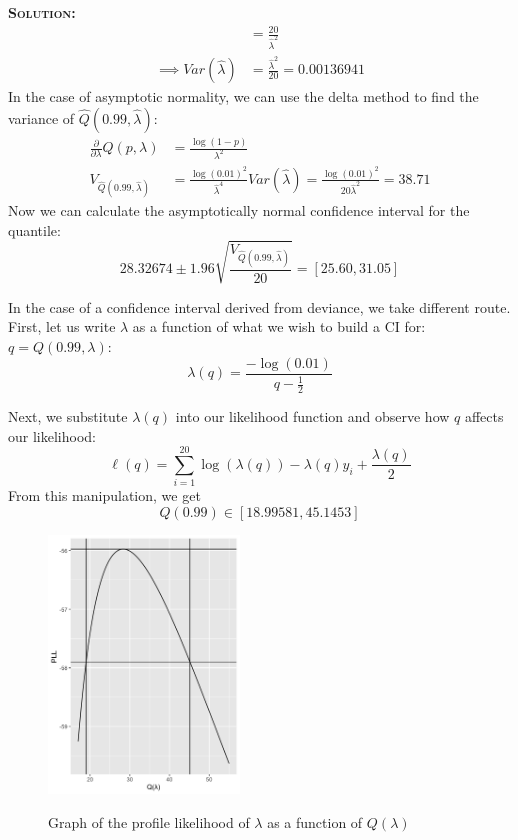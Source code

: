 \documentclass[12pt,oneside]{article}
\newenvironment{solution}
    {\textbf{\textsc{Solution:}}\\}
    {\newpage}
\def\l{\ell}
\def\pt{\partial}
\begin{document}
\begin{solution}
\begin{align*}
    &=\frac{20}{\hat{\lambda}^2}\\
    \implies Var(\hat{\lambda})&=\frac{\hat{\lambda}^2}{20}=0.00136941
\end{align*}
In the case of asymptotic normality, we can use the delta method to find the variance of $\hat{Q}(0.99,\hat{\lambda})$:
\begin{align*}
    \frac{\pt}{\pt \lambda}Q(p,\lambda)&= \frac{\log(1-p)}{\lambda^2}\\
    V_{\hat{Q}(0.99,\hat{\lambda})}&= \frac{\log(0.01)^2}{\hat{\lambda}^4}Var(\hat{\lambda})=\frac{\log(0.01)^2}{20\hat{\lambda}^2}=38.71
\end{align*}
Now we can calculate the asymptotically normal confidence interval for the quantile:
\[ 28.32674 \pm 1.96 \sqrt{\frac{ V_{\hat{Q}(0.99,\hat{\lambda})}}{20}} =[25.60,31.05]\]

In the case of a confidence interval derived from deviance, we take  different route. First, let us write $\lambda$ as a function of what we wish to build a CI for: $q=Q(0.99,\lambda)$:
\[\lambda(q)=\frac{-\log(0.01)}{q- \frac{1}{2}}\]

Next, we substitute $\lambda(q)$ into our likelihood function and observe how $q$ affects our likelihood:
\[\l(q)=\sum_{i=1}^{20} \log(\lambda(q))-\lambda(q) y_i + \frac{\lambda(q)}{2}\]
From this manipulation, we get 
\[Q(0.99) \in [18.99581,45.1453]\]
\begin{figure}[H]
\begin{center}
{\includegraphics[width=2in]{a1/pll-lambda.png}}
\caption{Graph of the profile likelihood of $\lambda$ as a function of $Q(\lambda)$}
\end{center}
\end{figure}


\end{solution}
\end{document}
